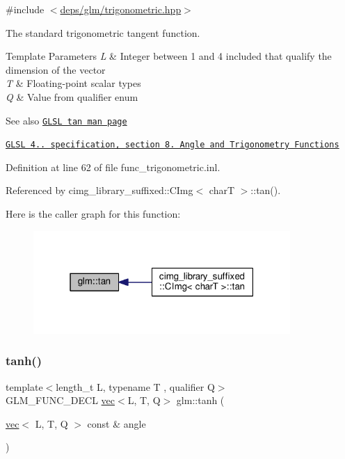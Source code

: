 {\ttfamily \#include $<$\hyperlink{trigonometric_8hpp}{deps/glm/trigonometric.\+hpp}$>$}

The standard trigonometric tangent function.


\begin{DoxyTemplParams}{Template Parameters}
{\em L} & Integer between 1 and 4 included that qualify the dimension of the vector \\
\hline
{\em T} & Floating-\/point scalar types \\
\hline
{\em Q} & Value from qualifier enum\\
\hline
\end{DoxyTemplParams}
\begin{DoxySeeAlso}{See also}
\href{http://www.opengl.org/sdk/docs/manglsl/xhtml/tan.xml}{\tt G\+L\+SL tan man page} 

\href{http://www.opengl.org/registry/doc/GLSLangSpec.4.20.8.pdf}{\tt G\+L\+SL 4.. specification, section 8. Angle and Trigonometry Functions} 
\end{DoxySeeAlso}


Definition at line 62 of file func\+\_\+trigonometric.\+inl.



Referenced by cimg\+\_\+library\+\_\+suffixed\+::\+C\+Img$<$ char\+T $>$\+::tan().

Here is the caller graph for this function\+:
\nopagebreak
\begin{figure}[H]
\begin{center}
\leavevmode
\includegraphics[width=277pt]{dc/d43/group__core__func__trigonometric_ga293a34cfb9f0115cc606b4a97c84f11f_icgraph}
\end{center}
\end{figure}
\mbox{\label{group__core__func__trigonometric_gaa1bccbfdcbe40ed2ffcddc2aa8bfd0f1}} 
\subsubsection{\texorpdfstring{tanh()}{tanh()}}
{\footnotesize\ttfamily template$<$length\+\_\+t L, typename T , qualifier Q$>$ \\
G\+L\+M\+\_\+\+F\+U\+N\+C\+\_\+\+D\+E\+CL \hyperlink{structglm_1_1vec}{vec}$<$L, T, Q$>$ glm\+::tanh (\begin{DoxyParamCaption}\item[{\hyperlink{structglm_1_1vec}{vec}$<$ L, T, Q $>$ const \&}]{angle }\end{DoxyParamCaption})}



